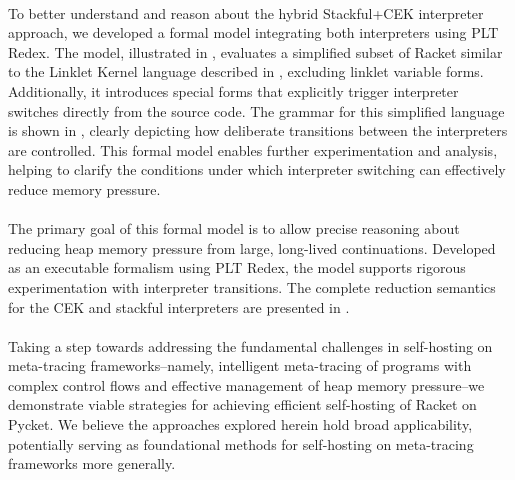       \paragraph{}%
        To better understand and reason about the hybrid Stackful+CEK interpreter approach, we developed a formal model integrating both interpreters using PLT Redex. The model, illustrated in , evaluates a simplified subset of Racket similar to the Linklet Kernel language described in , excluding linklet variable forms. Additionally, it introduces special  forms that explicitly trigger interpreter switches directly from the source code. The grammar for this simplified language is shown in , clearly depicting how deliberate transitions between the interpreters are controlled. This formal model enables further experimentation and analysis, helping to clarify the conditions under which interpreter switching can effectively reduce memory pressure.

      \paragraph{}%
        The primary goal of this formal model is to allow precise reasoning about reducing heap memory pressure from large, long-lived continuations. Developed as an executable formalism using PLT Redex, the model supports rigorous experimentation with interpreter transitions. The complete reduction semantics for the CEK and stackful interpreters are presented in .


      \paragraph{}%
        Taking a step towards addressing the fundamental challenges in self-hosting on meta-tracing frameworks--namely, intelligent meta-tracing of programs with complex control flows and effective management of heap memory pressure--we demonstrate viable strategies for achieving efficient self-hosting of Racket on Pycket. We believe the approaches explored herein hold broad applicability, potentially serving as foundational methods for self-hosting on meta-tracing frameworks more generally.




